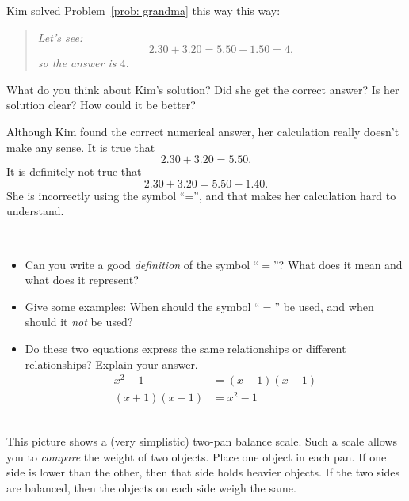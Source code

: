 \bigskip
\bigskip


\begin{thinkpair*}
Kim solved Problem~\ref{prob: grandma} this way this way:

\begin{quote}
\emph{
Let's see:
\[
2.30 + 3.20 = 5.50 - 1.50 = 4, 
\]
 so the answer is $4$.}
\end{quote}
What do you think about Kim's solution?  Did she get the correct answer?  Is her solution clear?  How could it be better?
\end{thinkpair*}

\bigskip
\bigskip

Although Kim found the correct numerical answer, her calculation really doesn't make any sense.  It is true that
\[
2.30 + 3.20 = 5.50.
\]
It is definitely not true that 
\[
2.30 + 3.20 = 5.50 - 1.40.
\]
She is incorrectly using the symbol ``='', and that makes her calculation hard to understand.  


\bigskip
\bigskip

\begin{thinkpair*}\ 
\begin{itemize}
\item
Can you write a good \emph{definition} of the symbol ``$=$''?  What does it mean and what does it represent?  \\

\item
Give some examples: When should the symbol ``$=$'' be used, and when should it \emph{not} be used?\\

\item
Do these two equations express the same relationships or different relationships?  Explain your answer.
\begin{align}
x^2 - 1 & = (x+1)(x-1)\\
(x+1)(x-1)  & = x^2 - 1
\end{align}\\

\end{itemize}
\end{thinkpair*}

\bigskip


This picture shows a (very simplistic) two-pan balance scale.  Such a scale allows you to \emph{compare} the weight of two objects.  Place one object in each pan.  If one side is lower than the other, then that side holds heavier objects.  If the two sides are balanced, then the objects on each side weigh the same.

